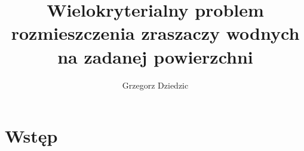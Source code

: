 \documentclass[twoside]{iisthesis}
\newcommand{\myfigure}[1]{%
\addcontentsline{figu}{myfigure}{\protect\numberline{\thefigure}#1}\par}
\begin{document}
\newcommand{\resultChart}[7][140]{
\def\dataS{{#2}}
	\begin{figure}[H]
	
\centering

\begin{center}
\begin{tikzpicture}
 
\begin{axis}[
ybar,
bar width=20,
legend style={at={(0.5,-0.25)},
anchor=north,legend columns=-1},
ylabel={Wartość miary},
symbolic x coords={\dataS},
xtick=data,
height=  {#1},
width=0.8\textwidth,
ymin=0, ytick={0,0.5,1},
ymax=1.5,
nodes near coords,
nodes near coords align={vertical},
]
\addplot coordinates { (\dataS,{#3}) };
\addplot coordinates {(\dataS,{#4}) };
\addplot coordinates { (\dataS,{#5}) };
\legend{Recall,Precission,F1-Score}
\end{axis}
\end{tikzpicture}
\end{center}
\caption{{#6}}
\myfigure{{#6}}
\label{{#7}}
\end{figure}
}


%
\nocite{*}
\title{ Wielokryterialny problem rozmieszczenia zraszaczy wodnych na zadanej powierzchni }
\author{Grzegorz Dziedzic}

\date{\number\the\year}




\maketitle

\textpages


\graphicspath{ {img/} }
\chapter{Wstęp}
\end{document}
